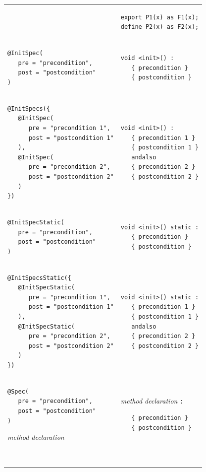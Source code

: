 \documentclass{article}
\begin{document}
\begin{longtable}{ m{7cm} | m{5cm} }
& 
\begin{verbatim}
export P1(x) as F1(x);
define P2(x) as F2(x);
\end{verbatim}
\\
\begin{verbatim}
@InitSpec(
   pre = "precondition", 
   post = "postcondition"
)
\end{verbatim}
&
\begin{verbatim}
void <init>() :
   { precondition }
   { postcondition }
\end{verbatim}
\\
\begin{verbatim}
@InitSpecs({
   @InitSpec(
      pre = "precondition 1", 
      post = "postcondition 1"
   ),
   @InitSpec(
      pre = "precondition 2",
      post = "postcondition 2"
   )
})
\end{verbatim}
&
\begin{verbatim}
void <init>() :
   { precondition 1 }
   { postcondition 1 }
   andalso
   { precondition 2 }
   { postcondition 2 }
\end{verbatim}
\\
\begin{verbatim}
@InitSpecStatic(
   pre = "precondition",
   post = "postcondition"
)
\end{verbatim}
&
\begin{verbatim}
void <init>() static :
   { precondition }
   { postcondition }
\end{verbatim}
\\
\begin{verbatim}
@InitSpecsStatic({
   @InitSpecStatic(
      pre = "precondition 1", 
      post = "postcondition 1"
   ),
   @InitSpecStatic(
      pre = "precondition 2",
      post = "postcondition 2"
   )
})
\end{verbatim}
&
\begin{verbatim}
void <init>() static :
   { precondition 1 }
   { postcondition 1 }
   andalso
   { precondition 2 }
   { postcondition 2 }
\end{verbatim}
\\
\begin{verbatim}
@Spec(
   pre = "precondition", 
   post = "postcondition"
)
\end{verbatim}
\it{method declaration}
&
{\it method declaration} \texttt{:}
\begin{verbatim}
   { precondition }
   { postcondition }
\end{verbatim}
\\
\begin{verbatim}

\end{verbatim}
\end{longtable}
\end{document}
